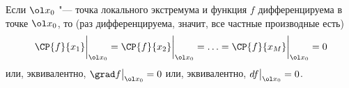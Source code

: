 
	 Если $\ol x_0$ "--- точка локального экстремума и функция $f$ дифференцируема в точке $\ol x_0$, то (раз дифференцируема, значит, все частные производные есть)
	 \[\CP{f}{x_1}\bigg|_{\ol x_0}=\CP{f}{x_2}\bigg|_{\ol x_0}=\ldots=\CP{f}{x_M}\bigg|_{\ol x_0}=0\]
	 или, эквивалентно, $\grad f\big|_{\ol x_0}=0$ или, эквивалентно, $df\big|_{\ol x_0}=0$.
	 